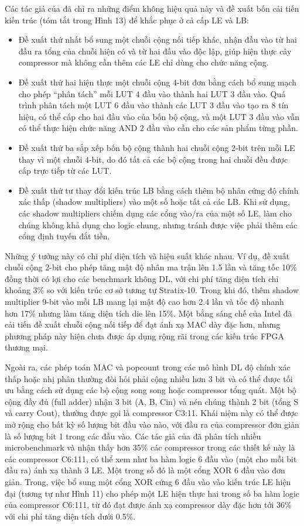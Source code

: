 \documentclass[a4paper]{article}
\begin{document}
Các tác giả của đã chỉ ra những điểm không hiệu quả này và đề xuất bốn cải tiến kiến trúc (tóm tắt trong Hình 13) để khắc phục ở cả cấp LE và LB:
\begin{itemize}
    \item Đề xuất thứ nhất bổ sung một chuỗi cộng nối tiếp khác, nhận đầu vào từ hai đầu ra tổng của chuỗi hiện có và từ hai đầu vào độc lập, giúp hiện thực cây compressor mà không cần thêm các LE chỉ dùng cho chức năng cộng.
    \item Đề xuất thứ hai hiện thực một chuỗi cộng 4-bit đơn bằng cách bổ sung mạch cho phép “phân tách” mỗi LUT 4 đầu vào thành hai LUT 3 đầu vào. Quá trình phân tách một LUT 6 đầu vào thành các LUT 3 đầu vào tạo ra 8 tín hiệu, có thể cấp cho hai đầu vào của bốn bộ cộng, và một LUT 3 đầu vào vẫn có thể thực hiện chức năng AND 2 đầu vào cần cho các sản phẩm từng phần.
    \item Đề xuất thứ ba sắp xếp bốn bộ cộng thành hai chuỗi cộng 2-bit trên mỗi LE thay vì một chuỗi 4-bit, do đó tất cả các bộ cộng trong hai chuỗi đều được cấp trực tiếp từ các LUT.
    \item Đề xuất thứ tư thay đổi kiến trúc LB bằng cách thêm bộ nhân cứng độ chính xác thấp (shadow multipliers) vào một số hoặc tất cả các LB. Khi sử dụng, các shadow multipliers chiếm dụng các cổng vào/ra của một số LE, làm cho chúng không khả dụng cho logic chung, nhưng tránh được việc phải thêm các cổng định tuyến đắt tiền.
\end{itemize}
Những ý tưởng này có chi phí diện tích và hiệu suất khác nhau. Ví dụ, đề xuất chuỗi cộng 2-bit cho phép tăng mật độ nhân ma trận lên 1.5 lần và tăng tốc 10\% đồng thời có lợi cho các benchmark không DL, với chi phí tăng diện tích chỉ khoảng 3\% so với kiến trúc cơ sở tương tự Stratix-10. Trong khi đó, thêm shadow multiplier 9-bit vào mỗi LB mang lại mật độ cao hơn 2.4 lần và tốc độ nhanh hơn 17\% nhưng làm tăng diện tích die lên 15\%. Một bằng sáng chế của Intel đã cải tiến đề xuất chuỗi cộng nối tiếp để đạt ánh xạ MAC dày đặc hơn, nhưng phương pháp này hiện chưa được áp dụng rộng rãi trong các kiến trúc FPGA thương mại.

Ngoài ra, các phép toán MAC và popcount trong các mô hình DL độ chính xác thấp hoặc nhị phân thường đòi hỏi phải cộng nhiều hơn 3 bit và có thể được tối ưu bằng cách sử dụng các bộ cộng song song hoặc compressor tổng quát. Một bộ cộng đầy đủ (full adder) nhận 3 bit (A, B, Cin) và nén chúng thành 2 bit (tổng S và carry Cout), thường được gọi là compressor C3:11. Khái niệm này có thể được mở rộng cho bất kỳ số lượng bit đầu vào nào, với đầu ra của compressor đơn giản là số lượng bit 1 trong các đầu vào. Các tác giả của đã phân tích nhiều microbenchmark và nhận thấy hơn 35\% các compressor trong các thiết kế này là các compressor C6:111, có thể xem như ba hàm logic 6 đầu vào (một cho mỗi bit đầu ra) ánh xạ thành 3 LE. Một trong số đó là một cổng XOR 6 đầu vào đơn giản. Trong, việc bổ sung một cổng XOR cứng 6 đầu vào vào kiến trúc LE hiện đại (tương tự như Hình 11) cho phép một LE hiện thực hai trong số ba hàm logic của compressor C6:111, từ đó đạt được ánh xạ compressor dày đặc hơn tới 36\% với chi phí tăng diện tích dưới 0.5\%.
\end{document}
